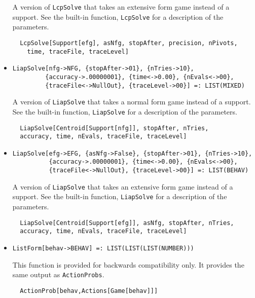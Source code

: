 \begin{itemize}
\bd 
A version of \verb+LcpSolve+ that takes an extensive form
game instead of a support.  See the built-in function,
\verb+LcpSolve+ for a description of the parameters.
\begin{verbatim}
  LcpSolve[Support[efg], asNfg, stopAfter, precision, nPivots,
    time, traceFile, traceLevel]
\end{verbatim} 
\ed

\item{}
\protect \large \begin{verbatim}
LiapSolve[nfg->NFG, {stopAfter->01}, {nTries->10}, 
         {accuracy->.00000001}, {time<->0.00}, {nEvals<->00}, 
         {traceFile<->NullOut}, {traceLevel->00}] =: LIST(MIXED)
\end{verbatim}\normalsize

\bd 
A version of \verb+LiapSolve+ that takes a normal form
game instead of a support.  See the built-in function,
\verb+LiapSolve+ for a description of the parameters.
\begin{verbatim}
  LiapSolve[Centroid[Support[nfg]], stopAfter, nTries,
  accuracy, time, nEvals, traceFile, traceLevel]
\end{verbatim} 
\ed

\item{}
\protect \large \begin{verbatim}
LiapSolve[efg->EFG, {asNfg->False}, {stopAfter->01}, {nTries->10}, 
          {accuracy->.00000001}, {time<->0.00}, {nEvals<->00}, 
          {traceFile<->NullOut}, {traceLevel->00}] =: LIST(BEHAV)
\end{verbatim}\normalsize

\bd 
A version of \verb+LiapSolve+ that takes an extensive form
game instead of a support.  See the built-in function,
\verb+LiapSolve+ for a description of the parameters.
\begin{verbatim}
  LiapSolve[Centroid[Support[efg]], asNfg, stopAfter, nTries,
  accuracy, time, nEvals, traceFile, traceLevel]
\end{verbatim} 
\ed

\item{}
\protect \large \begin{verbatim}
ListForm[behav->BEHAV] =: LIST(LIST(LIST(NUMBER))) 
\end{verbatim}\normalsize

\bd 
This function is provided for backwards compatibility only.  It
provides the same output as \verb+ActionProbs+.
\begin{verbatim}
  ActionProb[behav,Actions[Game[behav]]]
\end{verbatim} 
\ed


\end{itemize}
